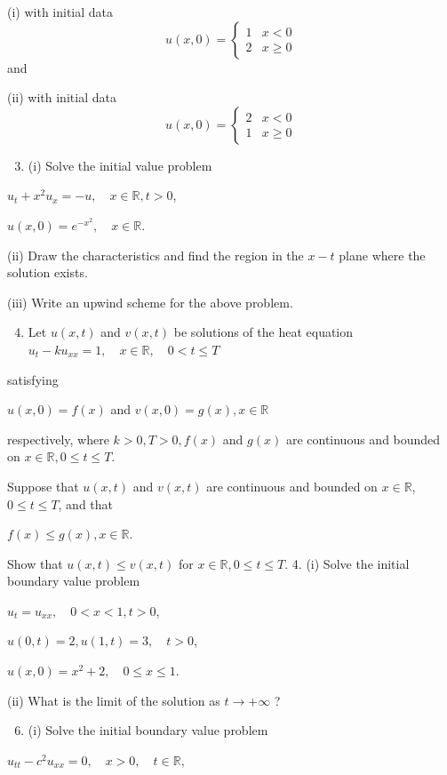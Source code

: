 \documentclass[10pt]{article}
\begin{document}
(i) with initial data
$$
u(x, 0)= \begin{cases}1 & x<0 \\ 2 & x \geq 0\end{cases}
$$
and

(ii) with initial data
$$
u(x, 0)= \begin{cases}2 & x<0 \\ 1 & x \geq 0\end{cases}
$$

\begin{enumerate}
  \setcounter{enumi}{2}
  \item (i) Solve the initial value problem
\end{enumerate}
$u_{t}+x^{2} u_{x}=-u, \quad x \in \mathbb{R}, t>0$,

$u(x, 0)=e^{-x^{2}}, \quad x \in \mathbb{R}$.

(ii) Draw the characteristics and find the region in the $x-t$ plane where the solution exists.

(iii) Write an upwind scheme for the above problem.

\begin{enumerate}
  \setcounter{enumi}{3}
  \item Let $u(x, t)$ and $v(x, t)$ be solutions of the heat equation $u_{t}-k u_{x x}=1, \quad x \in \mathbb{R}, \quad 0<t \leq T$
\end{enumerate}
satisfying

$u(x, 0)=f(x)$ and $v(x, 0)=g(x), x \in \mathbb{R}$

respectively, where $k>0, T>0, f(x)$ and $g(x)$ are continuous and bounded on $x \in \mathbb{R}, 0 \leq t \leq T$.

Suppose that $u(x, t)$ and $v(x, t)$ are continuous and bounded on $x \in \mathbb{R}$, $0 \leq t \leq T$, and that

$f(x) \leq g(x), x \in \mathbb{R} .$

Show that $u(x, t) \leq v(x, t)$ for $x \in \mathbb{R}, 0 \leq t \leq T$. 4. (i) Solve the initial boundary value problem

$u_{t}=u_{x x}, \quad 0<x<1, t>0$,

$u(0, t)=2, u(1, t)=3, \quad t>0$,

$u(x, 0)=x^{2}+2, \quad 0 \leq x \leq 1 .$

(ii) What is the limit of the solution as $t \rightarrow+\infty$ ?

\begin{enumerate}
  \setcounter{enumi}{5}
  \item (i) Solve the initial boundary value problem
\end{enumerate}
$u_{t t}-c^{2} u_{x x}=0, \quad x>0, \quad t \in \mathbb{R}$,
\end{document}
